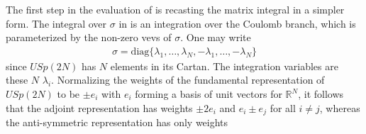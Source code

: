 \documentclass[12pt]{article}
\begin{document}
The first step in the evaluation of  is recasting the matrix integral in a simpler form. The integral over $\sigma$ in  is an integration over the Coulomb branch, which is parameterized by the non-zero vevs of $\sigma$. One may write 
\begin{eqnarray}
\sigma = \mathrm{diag}\{\lambda_1,\dots, \lambda_N, - \lambda_1, \dots, -\lambda_N \}
\end{eqnarray}
since $USp(2N)$ has $N$ elements in its Cartan. The integration variables are these $N$ $\lambda_i$. Normalizing the weights of the fundamental representation of $USp(2N)$ to be $\pm e_i$ with $e_i$ forming a basis of unit vectors for $\mathbb R^N$, it follows that the adjoint representation has weights $\pm 2 e_i$ and $e_i \pm e_j$ for all $i \neq j$, whereas the anti-symmetric representation has only weights
\end{document}
